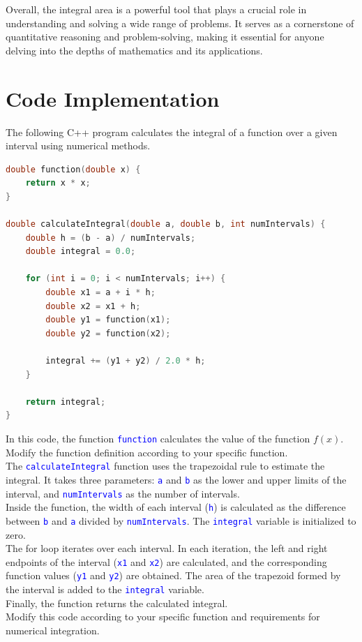 \documentclass{article}
\begin{document}
Overall, the integral area is a powerful tool that plays a crucial role in understanding and solving a wide range of problems. It serves as a cornerstone of quantitative reasoning and problem-solving, making it essential for anyone delving into the depths of mathematics and its applications.

\section{Code Implementation}
The following C++ program calculates the integral of a function over a given interval using numerical methods.

\begin{lstlisting}[language=C++, backgroundcolor=\color{blue!5}, basicstyle=\footnotesize]
double function(double x) {
    return x * x;
}

double calculateIntegral(double a, double b, int numIntervals) {
    double h = (b - a) / numIntervals;
    double integral = 0.0;

    for (int i = 0; i < numIntervals; i++) {
        double x1 = a + i * h;
        double x2 = x1 + h;
        double y1 = function(x1);
        double y2 = function(x2);

        integral += (y1 + y2) / 2.0 * h;
    }

    return integral;
}
\end{lstlisting}


In this code, the function \textcolor{blue}{\texttt{function}} calculates the value of the function $f(x)$. Modify the function definition according to your specific function. \\

The \textcolor{blue}{\texttt{calculateIntegral}} function uses the trapezoidal rule to estimate the integral. It takes three parameters: \textcolor{blue}{\texttt{a}} and \textcolor{blue}{\texttt{b}} as the lower and upper limits of the interval, and \textcolor{blue}{\texttt{numIntervals}} as the number of intervals. \\

Inside the function, the width of each interval (\textcolor{blue}{\texttt{h}}) is calculated as the difference between \textcolor{blue}{\texttt{b}} and \textcolor{blue}{\texttt{a}} divided by \textcolor{blue}{\texttt{numIntervals}}. The \textcolor{blue}{\texttt{integral}} variable is initialized to zero. \\

The for loop iterates over each interval. In each iteration, the left and right endpoints of the interval (\textcolor{blue}{\texttt{x1}} and \textcolor{blue}{\texttt{x2}}) are calculated, and the corresponding function values (\textcolor{blue}{\texttt{y1}} and \textcolor{blue}{\texttt{y2}}) are obtained. The area of the trapezoid formed by the interval is added to the \textcolor{blue}{\texttt{integral}} variable. \\

Finally, the function returns the calculated integral. \\
 
Modify this code according to your specific function and requirements for numerical integration. 
\end{document}
